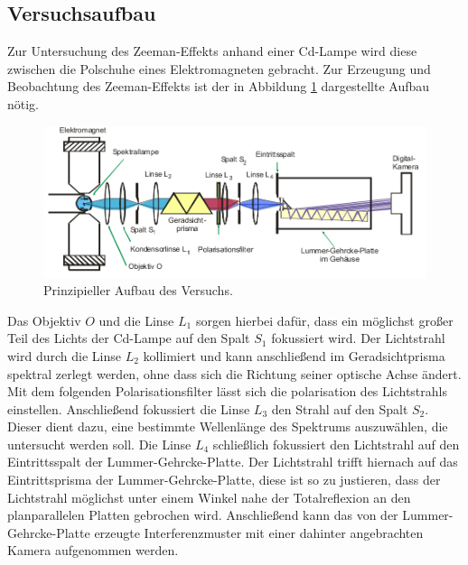 \subsection{Versuchsaufbau}
\label{sec:Versuchsaufbau}
Zur Untersuchung des Zeeman-Effekts anhand einer Cd-Lampe wird
diese zwischen die Polschuhe eines Elektromagneten gebracht.
Zur Erzeugung und Beobachtung des Zeeman-Effekts ist der in Abbildung \ref{fig:aufbau} dargestellte Aufbau nötig.

\begin{figure}
  \centering
  \includegraphics[width=0.98\columnwidth]{pictures/aufbau.png}
  \caption{Prinzipieller Aufbau des Versuchs.\cite{Anleitung}}
  \label{fig:aufbau}
\end{figure}
Das Objektiv $O$ und die Linse $L_1$ sorgen hierbei dafür, dass ein möglichst großer Teil des Lichts der Cd-Lampe auf den Spalt $S_1$ fokussiert wird.
Der Lichtstrahl wird durch die Linse $L_2$ kollimiert und kann anschließend im Geradsichtprisma spektral zerlegt werden, ohne dass sich die Richtung seiner optische Achse ändert.
Mit dem folgenden Polarisationsfilter lässt sich die polarisation des Lichtstrahls einstellen.
Anschließend fokussiert die Linse $L_3$ den Strahl auf den Spalt $S_2$. Dieser dient dazu, eine bestimmte Wellenlänge des Spektrums auszuwählen, die untersucht werden soll. Die Linse $L_4$ schließlich fokussiert den Lichtstrahl auf den Eintrittsspalt der Lummer-Gehrcke-Platte.
Der Lichtstrahl trifft hiernach auf das Eintrittsprisma der Lummer-Gehrcke-Platte, diese ist so zu justieren, dass der Lichtstrahl möglichst unter einem Winkel nahe der Totalreflexion an den planparallelen Platten gebrochen wird. Anschließend kann
das von der Lummer-Gehrcke-Platte erzeugte
Interferenzmuster mit einer dahinter angebrachten Kamera aufgenommen werden.
